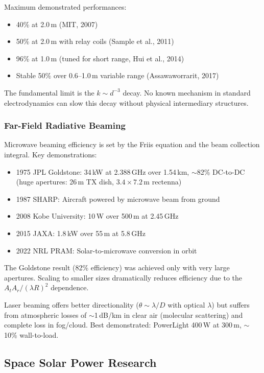 \documentclass[11pt,a4paper]{article}
\begin{document}
Maximum demonstrated performances:
\begin{itemize}
\item 40\% at 2.0\,m (MIT, 2007)
\item 50\% at 2.0\,m with relay coils (Sample et al., 2011)
\item 96\% at 1.0\,m (tuned for short range, Hui et al., 2014)
\item Stable 50\% over 0.6--1.0\,m variable range (Assawaworrarit, 2017)
\end{itemize}

The fundamental limit is the $k \sim d^{-3}$ decay. No known mechanism
in standard electrodynamics can slow this decay without
physical intermediary structures.

\subsubsection{Far-Field Radiative Beaming}

Microwave beaming efficiency is set by the Friis equation and the
beam collection integral. Key demonstrations:
\begin{itemize}
\item 1975 JPL Goldstone: 34\,kW at 2.388\,GHz over 1.54\,km,
$\sim$82\% DC-to-DC (huge apertures: 26\,m TX dish, $3.4 \times 7.2$\,m rectenna)
\item 1987 SHARP: Aircraft powered by microwave beam from ground
\item 2008 Kobe University: 10\,W over 500\,m at 2.45\,GHz
\item 2015 JAXA: 1.8\,kW over 55\,m at 5.8\,GHz
\item 2022 NRL PRAM: Solar-to-microwave conversion in orbit
\end{itemize}

The Goldstone result (82\% efficiency) was achieved only with very
large apertures. Scaling to smaller sizes dramatically reduces
efficiency due to the $A_t A_r / (\lambda R)^2$ dependence.

Laser beaming offers better directionality ($\theta \sim \lambda/D$
with optical $\lambda$) but suffers from atmospheric losses of
$\sim$1\,dB/km in clear air (molecular scattering) and complete
loss in fog/cloud. Best demonstrated: PowerLight 400\,W at 300\,m,
$\sim$10\% wall-to-load.

\subsection{Space Solar Power Research}
\end{document}
